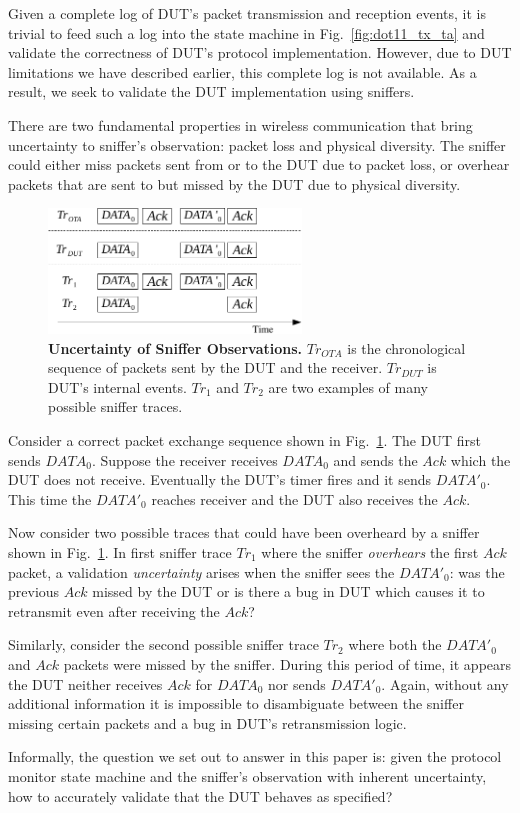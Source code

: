 Given a complete log of DUT's packet transmission and reception events, it is
trivial to feed such a log into the state machine in Fig.~\ref{fig:dot11_tx_ta}
and validate the correctness of DUT's protocol implementation. However, due to
DUT limitations we have described earlier, this complete log is not
available. As a result, we seek to validate the DUT implementation using
sniffers.

There are two fundamental properties in wireless communication that bring uncertainty to
sniffer's observation: packet loss and physical diversity. The sniffer could
either miss packets sent from or to the DUT due to packet loss, or overhear packets
that are sent to but missed by the DUT due to physical diversity.

\begin{figure}[H]
  \vspace*{-3mm}
  \centering
  \includegraphics[width=0.6\textwidth]{./figures/false_pos.pdf}
  \caption{\textbf{Uncertainty of Sniffer Observations.} $Tr_{OTA}$ is
    the chronological sequence of packets sent by the DUT and the receiver.
    $Tr_{DUT}$ is DUT's internal events. $Tr_1$ and $Tr_2$ are two examples of
    many possible sniffer traces.}
  \label{fig:sniffer_in_middle}
  \vspace*{-5mm}
\end{figure}

Consider a correct packet exchange sequence shown in
Fig.~\ref{fig:sniffer_in_middle}. The DUT first sends $DATA_0$.  Suppose the
receiver receives $DATA_0$ and sends the $Ack$ which the DUT does not receive.
Eventually the DUT's timer fires and it sends $DATA'_0$.  This time the
$DATA'_0$ reaches receiver and the DUT also receives the $Ack$.

Now consider two possible traces that could have been overheard by a sniffer shown
in Fig.~\ref{fig:sniffer_in_middle}.
In first sniffer trace $Tr_1$ where the sniffer
\textit{overhears} the first $Ack$ packet, a validation \textit{uncertainty}
arises when the sniffer sees the $DATA'_0$: was the previous $Ack$ missed by the
DUT or is there a bug in DUT which causes it to retransmit even after receiving
the $Ack$?

Similarly, consider the second possible sniffer trace $Tr_2$
where both the $DATA'_0$ and $Ack$ packets were missed by the sniffer. During
this period of time, it appears the DUT neither receives $Ack$ for $DATA_0$ nor
sends $DATA'_0$. Again, without any additional information it is impossible to
disambiguate between the sniffer missing certain packets and a bug in DUT's
retransmission logic.

Informally, the question we set out to answer in this paper is: given the
protocol monitor state machine and the sniffer's observation with inherent
uncertainty, how to accurately validate that the DUT behaves as specified?
